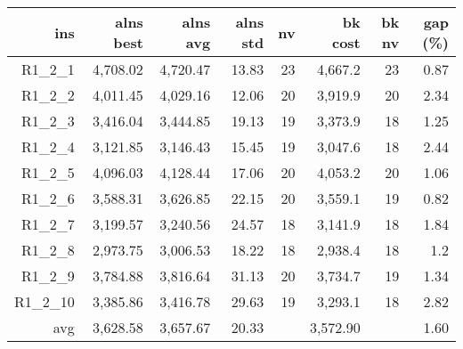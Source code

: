   \begin{table}[caption={Kết quả đo với tập HG\_R\_1\_2 200 yêu cầu}, label=exp:HGR12]
      \small
      \centering
      \begin{tabular}{rrrrrrrr}
        \hline
        ins & alns best & alns avg & alns std & nv & bk cost & bk nv & gap (\%) \\ \hline
        R1\_2\_1 & 4,708.02 & 4,720.47 & 13.83 & 23 & 4,667.2 & 23 & 0.87 \\ \hline
        R1\_2\_2 & 4,011.45 & 4,029.16 & 12.06 & 20 & 3,919.9 & 20 & 2.34 \\ \hline
        R1\_2\_3 & 3,416.04 & 3,444.85 & 19.13 & 19 & 3,373.9 & 18 & 1.25 \\ \hline
        R1\_2\_4 & 3,121.85 & 3,146.43 & 15.45 & 19 & 3,047.6 & 18 & 2.44 \\ \hline
        R1\_2\_5 & 4,096.03 & 4,128.44 & 17.06 & 20 & 4,053.2 & 20 & 1.06 \\ \hline
        R1\_2\_6 & 3,588.31 & 3,626.85 & 22.15 & 20 & 3,559.1 & 19 & 0.82 \\ \hline
        R1\_2\_7 & 3,199.57 & 3,240.56 & 24.57 & 18 & 3,141.9 & 18 & 1.84 \\ \hline
        R1\_2\_8 & 2,973.75 & 3,006.53 & 18.22 & 18 & 2,938.4 & 18 & 1.2 \\ \hline
        R1\_2\_9 & 3,784.88 & 3,816.64 & 31.13 & 20 & 3,734.7 & 19 & 1.34 \\ \hline
        R1\_2\_10 & 3,385.86 & 3,416.78 & 29.63 & 19 & 3,293.1 & 18 & 2.82 \\ \hline
        avg & 3,628.58 & 3,657.67 & 20.33 & & 3,572.90 & & 1.60 \\ \hline
      \end{tabular}
  \end{table}
      
